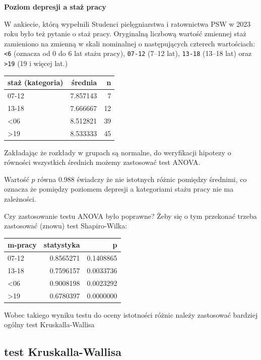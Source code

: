 \documentclass[
  openany]{book}
\begin{document}
\begin{example}
\textbf{Poziom depresji a staż pracy}

W ankiecie, którą wypełnili
Studenci pielęgniarstwa i ratownictwa PSW w 2023 roku
było też pytanie o staż pracy. Oryginalną liczbową wartość zmiennej
staż zamieniono na zmienną w skali nominalnej o następujących
czterech wartościach: \texttt{\textless{}6} (oznacza od 0 do 6 lat stażu pracy), \texttt{07-12} (7--12 lat), \texttt{13-18} (13--18 lat)
oraz \texttt{\textgreater{}19} (19 i więcej lat.)

\begin{tabular}{l|r|r}
\hline
staż (kategoria) & średnia & n\\
\hline
07-12 & 7.857143 & 7\\
\hline
13-18 & 7.666667 & 12\\
\hline
<06 & 8.512821 & 39\\
\hline
>19 & 8.533333 & 45\\
\hline
\end{tabular}

Zakładając że rozkłady w grupach są normalne, do weryfikacji hipotezy o równości wszystkich
średnich możemy zastosować test ANOVA.

Wartość \(p\) równa 0.988 świadczy że nie istotnych różnic pomiędzy średnimi, co oznacza
że pomiędzy poziomem depresji a kategoriami stażu pracy nie ma zależności.

Czy zastosowanie testu ANOVA było poprawne? Żeby się o tym przekonać trzeba
zastosować (znowu) test Shapiro-Wilka:

\begin{tabular}{l|r|r}
\hline
m-pracy & statystyka & p\\
\hline
07-12 & 0.8565271 & 0.1408865\\
\hline
13-18 & 0.7596157 & 0.0033736\\
\hline
<06 & 0.9008198 & 0.0023292\\
\hline
>19 & 0.6780397 & 0.0000000\\
\hline
\end{tabular}

Wobec takiego wyniku testu do oceny istotności różnic
należy zastosować bardziej ogólny test Kruskalla-Wallisa
\end{example}

\hypertarget{test-kruskalla-wallisa}{%
\subsection{test Kruskalla-Wallisa}\label{test-kruskalla-wallisa}}
\end{document}

